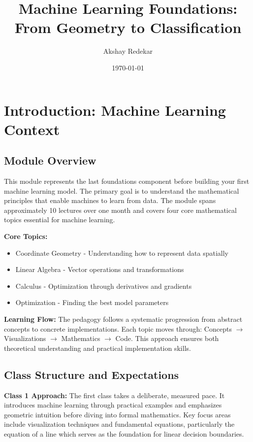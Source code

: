 \documentclass[12pt,a4paper]{article}
\title{\textbf{Machine Learning Foundations: \\ From Geometry to Classification}}
\author{Akshay Redekar}
\date{\today}
\theoremstyle{directpoint}
\theoremstyle{definition}
\begin{document}
\maketitle
\tableofcontents
\newpage

\section{Introduction: Machine Learning Context}

\subsection{Module Overview}

This module represents the last foundations component before building your first machine learning model. The primary goal is to understand the mathematical principles that enable machines to learn from data. The module spans approximately 10 lectures over one month and covers four core mathematical topics essential for machine learning.

\textbf{Core Topics:}
\begin{itemize}
    \item Coordinate Geometry - Understanding how to represent data spatially
    \item Linear Algebra - Vector operations and transformations
    \item Calculus - Optimization through derivatives and gradients
    \item Optimization - Finding the best model parameters
\end{itemize}

\textbf{Learning Flow:} The pedagogy follows a systematic progression from abstract concepts to concrete implementations. Each topic moves through: Concepts $\rightarrow$ Visualizations $\rightarrow$ Mathematics $\rightarrow$ Code. This approach ensures both theoretical understanding and practical implementation skills.

\subsection{Class Structure and Expectations}

\textbf{Class 1 Approach:} The first class takes a deliberate, measured pace. It introduces machine learning through practical examples and emphasizes geometric intuition before diving into formal mathematics. Key focus areas include visualization techniques and fundamental equations, particularly the equation of a line which serves as the foundation for linear decision boundaries.
\end{document}
